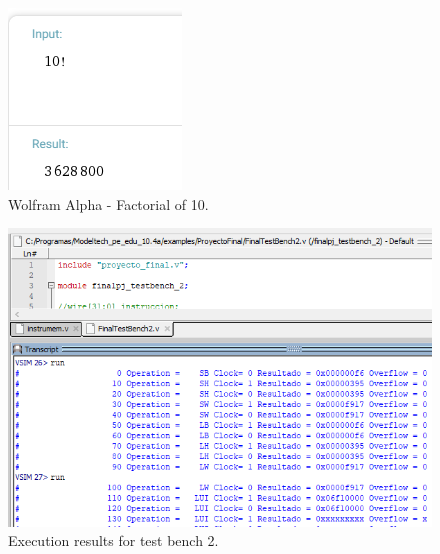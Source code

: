 \documentclass[conference]{IEEEtran}
\begin{document}
\begin{figure}[h]
\begin{center}
\includegraphics[scale=0.7]{factorial_10.png}
\caption{Wolfram Alpha - Factorial of 10. \cite{b6}}
\label{result_factorial}
\end{center}
\end{figure}

\begin{figure}[h]
\includegraphics[scale=0.5]{ModelSim_testbench2_clock_cycles.png}
\caption{Execution results for test bench 2.}
\label{result2}
\end{figure}
\end{document}
